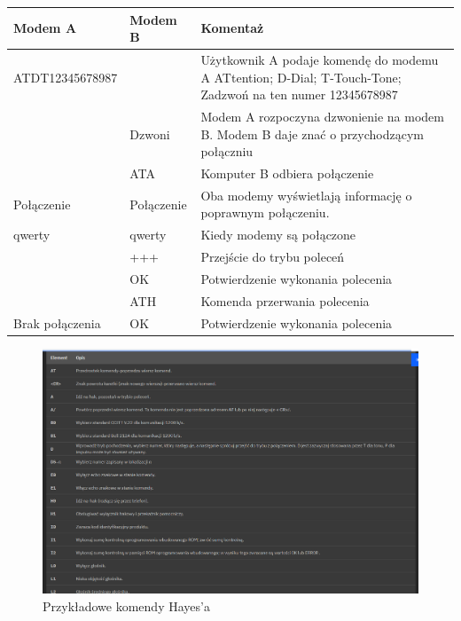 \documentclass{article}
\begin{document}
                \begin{table}
                    \begin{tabular}{|l|l|p{8cm}|}
                        \hline
                        Modem A & Modem B & Komentaż \\ \hline
                        ATDT12345678987 & & Użytkownik A podaje komendę do modemu A ATtention; D-Dial; T-Touch-Tone;
                        Zadzwoń na ten numer 12345678987 \\ \hline
                        & Dzwoni & Modem A rozpoczyna dzwonienie na modem B. Modem B daje znać o przychodzącym 
                        połączniu\\ \hline
                        & ATA & Komputer B odbiera połączenie\\ \hline
                        Połączenie & Połączenie & Oba modemy wyświetlają informację o poprawnym połączeniu.\\ \hline
                        qwerty & qwerty & Kiedy modemy są połączone\\ \hline
                        & +++ & Przejście do trybu poleceń\\ \hline
                        & OK & Potwierdzenie wykonania polecenia\\ \hline
                        & ATH & Komenda przerwania polecenia\\ \hline
                        Brak połączenia & OK & Potwierdzenie wykonania polecenia \\ \hline
                    \end{tabular}
                \end{table}
                \FloatBarrier
                \begin{figure}[ht]
                    \centering
                    \includegraphics[width=\textwidth]{images/Zrzut ekranu 2025-02-02 214224.png}
                    \caption{Przykładowe komendy Hayes'a}
                    \label{fig:tex2}
                \end{figure}
                \FloatBarrier   
\end{document}

